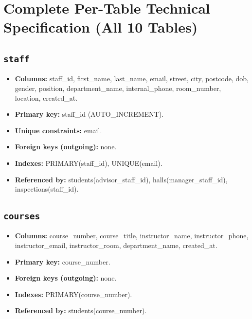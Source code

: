 \documentclass[11pt,a4paper]{article}
\begin{document}
\section{Complete Per-Table Technical Specification (All 10 Tables)}
\subsection{\texttt{staff}}
\begin{itemize}
  \item \textbf{Columns:} staff\_id, first\_name, last\_name, email, street, city, postcode, dob, gender, position, department\_name, internal\_phone, room\_number, location, created\_at.
  \item \textbf{Primary key:} staff\_id (AUTO\_INCREMENT).
  \item \textbf{Unique constraints:} email.
  \item \textbf{Foreign keys (outgoing):} none.
  \item \textbf{Indexes:} PRIMARY(staff\_id), UNIQUE(email).
  \item \textbf{Referenced by:} students(advisor\_staff\_id), halls(manager\_staff\_id), inspections(staff\_id).
\end{itemize}

\subsection{\texttt{courses}}
\begin{itemize}
  \item \textbf{Columns:} course\_number, course\_title, instructor\_name, instructor\_phone, instructor\_email, instructor\_room, department\_name, created\_at.
  \item \textbf{Primary key:} course\_number.
  \item \textbf{Foreign keys (outgoing):} none.
  \item \textbf{Indexes:} PRIMARY(course\_number).
  \item \textbf{Referenced by:} students(course\_number).
\end{itemize}
\end{document}
